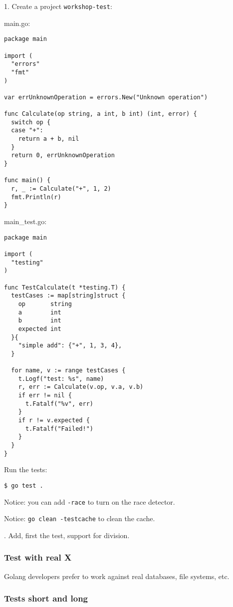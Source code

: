 \documentclass[11pt, letterpaper]{article}
\begin{document}
1. Create a project \verb|workshop-test|:

main.go:

\begin{verbatim}
package main

import (
  "errors"
  "fmt"
)

var errUnknownOperation = errors.New("Unknown operation")

func Calculate(op string, a int, b int) (int, error) {
  switch op {
  case "+":
    return a + b, nil
  }
  return 0, errUnknownOperation
}

func main() {
  r, _ := Calculate("+", 1, 2)
  fmt.Println(r)
}
\end{verbatim}

main\_test.go:

\begin{verbatim}
package main

import (
  "testing"
)

func TestCalculate(t *testing.T) {
  testCases := map[string]struct {
    op       string
    a        int
    b        int
    expected int
  }{
    "simple add": {"+", 1, 3, 4},
  }

  for name, v := range testCases {
    t.Logf("test: %s", name)
    r, err := Calculate(v.op, v.a, v.b)
    if err != nil {
      t.Fatalf("%v", err)
    }
    if r != v.expected {
      t.Fatalf("Failed!")
    }
  }
}
\end{verbatim}

Run the tests:

\begin{verbatim}
$ go test .
\end{verbatim}

Notice: you can add \verb|-race| to turn on the race detector.

Notice: \verb|go clean -testcache| to clean the cache.

. Add, first the test, support for division.

\subsubsection{Test with real X}

Golang developers prefer to work against real databases, file systems, etc.

\subsubsection{Tests short and long}
\end{document}
